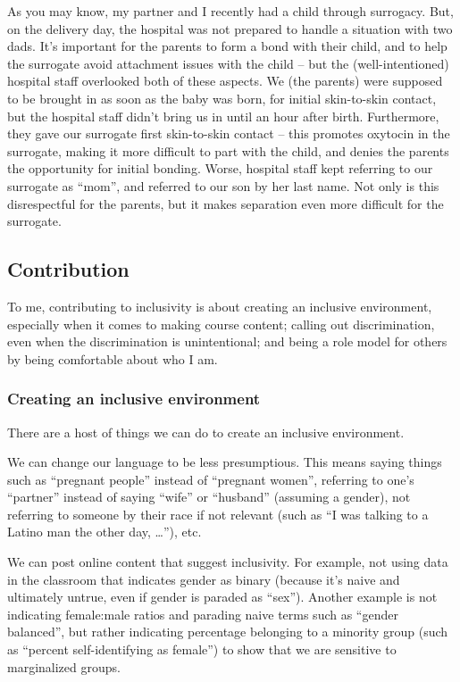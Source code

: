 \documentclass[]{article}
\begin{document}
As you may know, my partner and I recently had a child through surrogacy. But, on the delivery day, the hospital was not prepared to handle a situation with two dads. It's important for the parents to form a bond with their child, and to help the surrogate avoid attachment issues with the child -- but the (well-intentioned) hospital staff overlooked both of these aspects. We (the parents) were supposed to be brought in as soon as the baby was born, for initial skin-to-skin contact, but the hospital staff didn't bring us in until an hour after birth. Furthermore, they gave our surrogate first skin-to-skin contact -- this promotes oxytocin in the surrogate, making it more difficult to part with the child, and denies the parents the opportunity for initial bonding. Worse, hospital staff kept referring to our surrogate as ``mom'', and referred to our son by her last name. Not only is this disrespectful for the parents, but it makes separation even more difficult for the surrogate.

\hypertarget{contribution}{%
\subsection{Contribution}\label{contribution}}

To me, contributing to inclusivity is about creating an inclusive environment, especially when it comes to making course content; calling out discrimination, even when the discrimination is unintentional; and being a role model for others by being comfortable about who I am.

\hypertarget{creating-an-inclusive-environment}{%
\subsubsection{Creating an inclusive environment}\label{creating-an-inclusive-environment}}

There are a host of things we can do to create an inclusive environment.

We can change our language to be less presumptious. This means saying things such as ``pregnant people'' instead of ``pregnant women'', referring to one's ``partner'' instead of saying ``wife'' or ``husband'' (assuming a gender), not referring to someone by their race if not relevant (such as ``I was talking to a Latino man the other day, \ldots{}''), etc.

We can post online content that suggest inclusivity. For example, not using data in the classroom that indicates gender as binary (because it's naive and ultimately untrue, even if gender is paraded as ``sex''). Another example is not indicating female:male ratios and parading naive terms such as ``gender balanced'', but rather indicating percentage belonging to a minority group (such as ``percent self-identifying as female'') to show that we are sensitive to marginalized groups.
\end{document}
